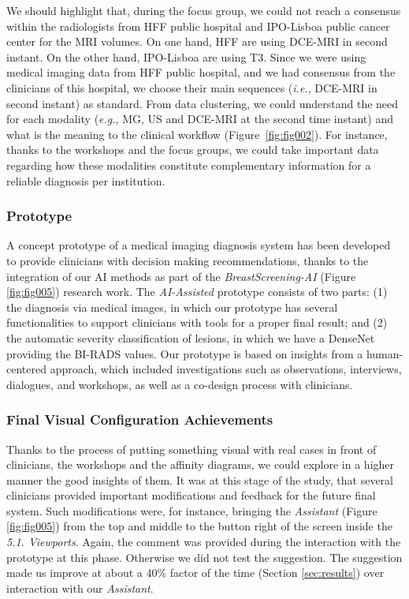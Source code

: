 We should highlight that, during the focus group, we could not reach a consensus within the radiologists from HFF public hospital and IPO-Lisboa public cancer center for the MRI volumes.
On one hand, HFF are using DCE-MRI in second instant.
On the other hand, IPO-Lisboa are using T3.
Since we were using medical imaging data from HFF public hospital, and we had consensus from the clinicians of this hospital, we choose their main sequences ({\it i.e.}, DCE-MRI in second instant) as standard.
From data clustering, we could understand the need for each modality ({\it e.g.}, MG, US and DCE-MRI at the second time instant) and what is the meaning to the clinical workflow (Figure~\ref{fig:fig002}).
For instance, thanks to the workshops and the focus groups, we could take important data regarding how these modalities constitute complementary information for a reliable diagnosis per institution.

\subsubsection{Prototype}
\label{sec:prototype}

A concept prototype of a medical imaging diagnosis system has been developed to provide clinicians with decision making recommendations, thanks to the integration of our AI methods as part of the {\it BreastScreening-AI} (Figure \ref{fig:fig005}) research work.
The {\it AI-Assisted} prototype consists of two parts:
(1) the diagnosis via medical images, in which our prototype has several functionalities to support clinicians with tools for a proper final result; and
(2) the automatic severity classification of lesions, in which we have a DenseNet providing the BI-RADS values.
Our prototype is based on insights from a human-centered approach, which included investigations such as observations, interviews, dialogues, and workshops, as well as a co-design process with clinicians.

\subsubsection{Final Visual Configuration Achievements}

Thanks to the process of putting something visual with real cases in front of clinicians, the workshops and the affinity diagrams, we could explore in a higher manner the good insights of them.
It was at this stage of the study, that several clinicians provided important modifications and feedback for the future final system.
Such modifications were, for instance, bringing the {\it Assistant} (Figure \ref{fig:fig005}) from the top and middle to the button right of the screen inside the {\it 5.1. Viewports}.
Again, the comment was provided during the interaction with the prototype at this phase.
Otherwise we did not test the suggestion.
The suggestion made us improve at about a 40\% factor of the time (Section \ref{sec:results}) over interaction with our {\it Assistant}.

